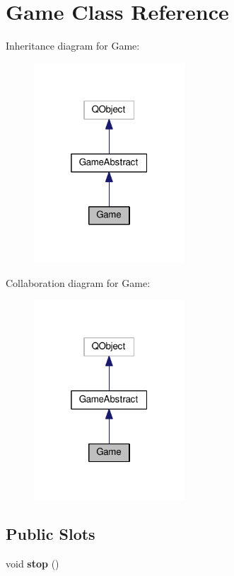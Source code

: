 \hypertarget{classGame}{}\section{Game Class Reference}
\label{classGame}


Inheritance diagram for Game\+:
\nopagebreak
\begin{figure}[H]
\begin{center}
\leavevmode
\includegraphics[width=160pt]{classGame__inherit__graph}
\end{center}
\end{figure}


Collaboration diagram for Game\+:
\nopagebreak
\begin{figure}[H]
\begin{center}
\leavevmode
\includegraphics[width=160pt]{classGame__coll__graph}
\end{center}
\end{figure}
\subsection*{Public Slots}
\begin{DoxyCompactItemize}
\item 
\mbox{\label{classGame_a17fbb36fd4a2085f9ff4f1fa93d7d08b}} 
void {\bfseries stop} ()
\end{DoxyCompactItemize}
